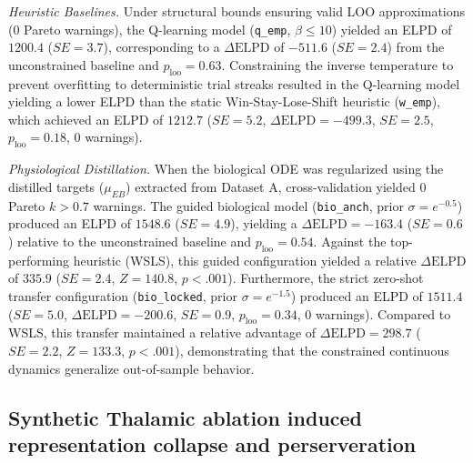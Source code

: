 \documentclass[12pt, a4paper]{extarticle}
\begin{document}
	\textit{Heuristic Baselines.} Under structural bounds ensuring valid LOO approximations (0 Pareto warnings), the Q-learning model (\texttt{q\_emp}, $\beta \le 10$) yielded an ELPD of $1200.4$ ($SE = 3.7$), corresponding to a $\Delta\text{ELPD}$ of $-511.6$ ($SE = 2.4$) from the unconstrained baseline and $p_{\text{loo}} = 0.63$. Constraining the inverse temperature to prevent overfitting to deterministic trial streaks resulted in the Q-learning model yielding a lower ELPD than the static Win-Stay-Lose-Shift heuristic (\texttt{w\_emp}), which achieved an ELPD of $1212.7$ ($SE = 5.2$, $\Delta\text{ELPD} = -499.3$, $SE = 2.5$, $p_{\text{loo}} = 0.18$, 0 warnings).
	
	\textit{Physiological Distillation.} When the biological ODE was regularized using the distilled targets ($\mu_{EB}$) extracted from Dataset A, cross-validation yielded 0 Pareto $k > 0.7$ warnings. The guided biological model (\texttt{bio\_anch}, prior $\sigma=e^{-0.5}$) produced an ELPD of $1548.6$ ($SE = 4.9$), yielding a $\Delta\text{ELPD} = -163.4$ ($SE = 0.6$) relative to the unconstrained baseline and $p_{\text{loo}} = 0.54$. Against the top-performing heuristic (WSLS), this guided configuration yielded a relative $\Delta\text{ELPD}$ of $335.9$ ($SE = 2.4$, $Z = 140.8$, $p < .001$). Furthermore, the strict zero-shot transfer configuration (\texttt{bio\_locked}, prior $\sigma=e^{-1.5}$) produced an ELPD of $1511.4$ ($SE = 5.0$, $\Delta\text{ELPD} = -200.6$, $SE = 0.9$, $p_{\text{loo}} = 0.34$, 0 warnings). Compared to WSLS, this transfer maintained a relative advantage of $\Delta\text{ELPD} = 298.7$ ($SE = 2.2$, $Z = 133.3$, $p < .001$), demonstrating that the constrained continuous dynamics generalize out-of-sample behavior.
	
	\subsection{Synthetic Thalamic ablation induced representation collapse and perserveration}
	
\end{document}
